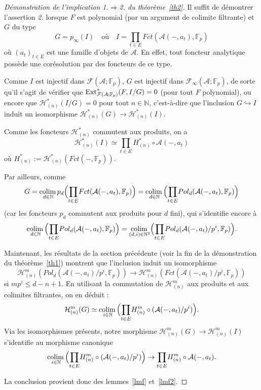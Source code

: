 \documentclass[a4paper,10pt]{article}
\newcommand{\A}{{\mathcal{A}}}
\newcommand{\F}{{\mathcal{F}}}
\newcommand{\Hh}{{\mathcal{H}}}
\newcommand{\col}{{\rm colim}\,}
\theoremstyle{definition}
\theoremstyle{remark}
\begin{document}
\begin{proof}[Démonstration de l'implication 1.$\Rightarrow$2. du théorème~\ref{th2}]
Il suffit de démontrer l'assertion {\em 2.} lorsque $F$ est polynomial (par un argument de colimite filtrante) et $G$ du type
$$G=p_\infty(I)\quad\text{où}\quad I=\underset{t\in E}{\prod}Fct(\A(-,a_t),\mathbb{F}_p)$$
où $(a_t)_{t\in E}$ est une famille d'objets de $\A$. En effet, tout foncteur analytique possède une corésolution par des foncteurs de ce type.

Comme $I$ est injectif dans $\F(\A;\mathbb{F}_p)$, $G$ est injectif dans $\F_\infty(\A;\mathbb{F}_p)$, de sorte qu'il s'agit de vérifier que ${\rm Ext}^*_{\F(\A;\mathbb{F}_p)}(F,I/G)=0$ (pour tout $F$ polynomial), ou encore que $\Hh^*_{(n)}(I/G)=0$ pour tout $n\in\mathbb{N}$, c'est-à-dire que l'inclusion $G\hookrightarrow I$ induit un isomorphisme $\Hh^*_{(n)}(G)\to\Hh^*_{(n)}(I)$.

Comme les foncteurs $\Hh_{(n)}^*$ commutent aux produits, on a
$$\Hh_{(n)}^*(I)\simeq\underset{t\in E}{\prod}H^*_{(n)}\circ\A(-,a_t)$$
où $H^*_{(n)}:=\Hh_{(n)}^*(Fct(-,\mathbb{F}_p))$.

Par ailleurs, comme
$$G=\underset{d\in\mathbb{N}}{\col}p_d\Big(\underset{t\in E}{\prod}Fct(\A(-,a_t),\mathbb{F}_p)\Big)=\underset{d\in\mathbb{N}}{\col}\Big(\underset{t\in E}{\prod}Pol_d(\A(-,a_t),\mathbb{F}_p)\Big)$$
(car les foncteurs $p_d$ commutent aux produits pour $d$ fini), qui s'identifie encore à
$$\underset{d\in\mathbb{N}}{\col}\Big(\underset{t\in E}{\prod}Pol_d(\A(-,a_t),\mathbb{F}_p)\Big)=\underset{(d,i)\in\mathbb{N}^2}{\col}\Big(\underset{t\in E}{\prod}Pol_d(\A(-,a_t)/p^i,\mathbb{F}_p)\Big).$$

Maintenant, les résultats de la section précédente (voir la fin de la démonstration du théorème~\ref{th1}) montrent que l'inclusion induit un isomorphisme
$$\Hh_{(n)}^m(Pol_d(\A(-,a_t)/p^i,\mathbb{F}_p))\to\Hh_{(n)}^m(Fct(\A(-,a_t)/p^i,\mathbb{F}_p))$$
si $mp^i\leq d-n+1$. En utilisant la commutation de $\Hh_{(n)}^m$ aux produits et aux colimites filtrantes, on en déduit :
$$\Hh_{(n)}^m(G)\simeq\underset{i\in\mathbb{N}}{\col}\Big(\underset{t\in E}{\prod}H_{(n)}^m\circ(\A(-,a_t)/p^i)\Big).$$
Via les isomorphismes présents, notre morphisme $\Hh_{(n)}^m(G)\to\Hh_{(n)}^m(I)$ s'identifie au morphisme canonique
$$\underset{i\in\mathbb{N}}{\col}\Big(\underset{t\in E}{\prod}H_{(n)}^m\circ(\A(-,a_t)/p^i)\Big)\to\underset{t\in E}{\prod}H_{(n)}^m\circ\A(-,a_t).$$

La conclusion provient donc des lemmes~\ref{lmf} et~\ref{lmf2}.
\end{proof}
\end{document}

